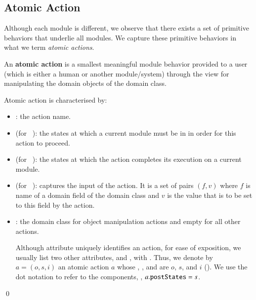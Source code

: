 \subsection{Atomic Action} \label{sect:arch-atomic-action}
Although each module is different, we observe that there exists a set of primitive behaviors that underlie all modules. We capture these primitive behaviors in what we term \textit{atomic actions}.
%
\begin{definition} \label{def:atomic-action}
An \textbf{atomic action} is a smallest meaningful module behavior provided to a user (which is either a human or another module/system) through the view for manipulating the domain objects of the domain class.

%
Atomic action is characterised by: 
\begin{itemize}
\item {}: the action name.
%
\item {} (for ~\cite{omg_unified_2015}): the states at which a current module must be in in order for this action to proceed.
%
\item {} (for ~\cite{omg_unified_2015}): the states at which the action completes its execution on a current module.
%
\item {} (for ~\cite{omg_unified_2015}): captures the input of the action. It is a set of pairs $(f,v)$ where $f$ is name of a domain field of the domain class and $v$ is the value that is to be set to this field by the action. 
%
\item {}: the domain class for object manipulation actions and empty for all other actions.

Although attribute  uniquely identifies an action, for ease of exposition, we usually list two other attributes,  and , with .
%
Thus, we denote by $ a = (o,s,i) $ an atomic action $a$ whose , , and  are $ o $, $ s $, and $i$ (\resp). We use the dot notation to refer to the components, \eg, $ a.{\tt postStates} = s$.
\end{itemize} \qed
\end{definition}

